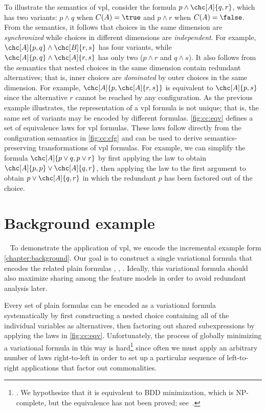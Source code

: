 To illustrate the semantics of \ac{vpl}, consider the formula
$p\wedge\chc[A]{q,r}$, which has two variants: $p\wedge q$ when $C(A)=\true$
and $p\wedge r$ when $C(A)=\false$.
%
From the semantics, it follows that choices in the same dimension are
\emph{synchronized} while choices in different dimensions are
\emph{independent}. For example, $\chc[A]{p,q}\wedge\chc[B]{r,s}$ has four
variants, while $\chc[A]{p,q}\wedge\chc[A]{r,s}$ has only two ($p\wedge r$ and
$q\wedge s$).
%
It also follows from the semantics that nested choices in the same dimension
contain redundant alternatives; that is, inner choices are \emph{dominated} by
outer choices in the same dimension. For example, $\chc[A]{p,\chc[A]{r,s}}$ is
equivalent to $\chc[A]{p,s}$ since the alternative $r$ cannot be reached by any
configuration.
%
As the previous example illustrates, the representation of a \ac{vpl} formula is
not unique; that is, the same set of variants may be encoded by different
formulas. \autoref{fig:cc:eqv} defines a set of equivalence laws for
\ac{vpl} formulas. These laws follow directly from the configuration semantics in
\autoref{fig:cc:cfg} and can be used to derive semantics-preserving
transformations of \ac{vpl} formulas.
%
For example, we can simplify the formula $\chc[A]{p\vee q, p\vee r}$ by first
applying the  law to obtain $\chc[A]{p,p}\vee\chc[A]{q,r}$, then applying
the  law to the first argument to obtain $p\vee\chc[A]{q,r}$ in which
the redundant $p$ has been factored out of the choice.
%
\section{Background example}
~\label{section:background}
%
To demonstrate the application of \ac{vpl}, we encode the incremental example
form \autoref{chapter:background}. Our goal is to construct a single variational
formula that encodes the related plain formulas \pV{}, \qV{}, \rV{}. Ideally,
this variational formula should also maximize sharing among the feature models
in order to avoid redundant analysis later.

Every set of plain formulas can be encoded as a variational formula
systematically by first constructing a nested choice containing all of the
individual variables as alternatives, then factoring out shared subexpressions
by applying the laws in \autoref{fig:cc:eqv}.
%
Unfortunately, the process of globally minimizing a variational formula in this
way is hard\footnote{\label{vpl:bdd}. We hypothesize that it is equivalent to
  BDD minimization, which is NP-complete, but the equivalence has not been
  proved; see~\cite{Walk14onward}.} since often we must apply an arbitrary
number of laws right-to-left in order to set up a particular sequence of
left-to-right applications that factor out commonalities.

